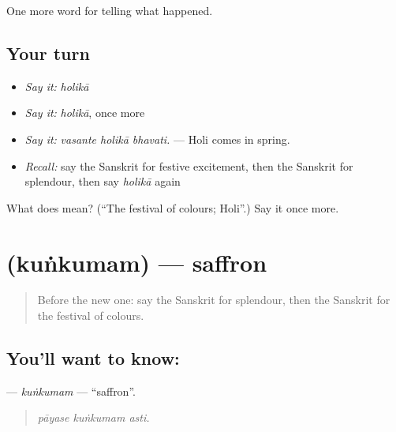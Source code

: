\begin{grammarlens}[title={What you've built}]
One more word for telling what happened.
\end{grammarlens}

\subsection*{Your turn}
\begin{itemize}
\raggedright
  \item \emph{Say it:} \emph{holikā}
  \item \emph{Say it:} \emph{holikā}, once more
  \item \emph{Say it:} \emph{vasante holikā bhavati.} — Holi comes in spring.
  \item \emph{Recall:} say the Sanskrit for festive excitement, then the Sanskrit for splendour, then say \emph{holikā} again
\end{itemize}

\begin{tcolorbox}[breakable,colback=teal!4,colframe=teal!35!black,title={Before you move on}]
What does  mean? (\textquotedblleft{}The festival of colours; Holi\textquotedblright{}.) Say it once more.
\end{tcolorbox}
\section[\texorpdfstring{\sk{कुंकुमम्} (kuṅkumam)}{कुंकुमम् (kuṅkumam)}]{ (kuṅkumam) — saffron}

\label{lesson:SA-C327-kunkumam}



\begin{quote}
Before the new one: say the Sanskrit for splendour, then the Sanskrit for the festival of colours.
\end{quote}

\subsection*{You'll want to know: }
\textbf{} — \emph{kuṅkumam} — \textquotedblleft{}saffron\textquotedblright{}.

\begin{quote}
  
\end{quote}

\begin{quote}
\emph{pāyase kuṅkumam asti.}
\end{quote}

